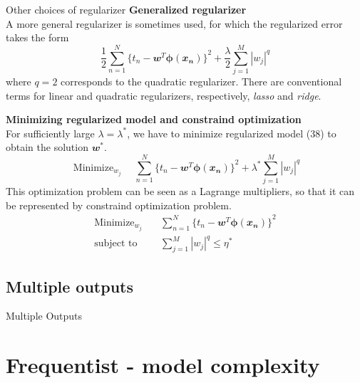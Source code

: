 \documentclass{bredelebeamer}
\DeclareMathOperator*{\minimize}{Minimize}
\begin{document}
\begin{frame}{Other choices of regularizer}
  \textbf{Generalized regularizer}\\
  A more general regularizer is sometimes used, for which the regularized error
  takes the form
  \begin{equation}
    \frac{1}{2} \sum_{n=1}^{N} {\{t_n - \mathbfit{w}^T \boldsymbol{\phi}(\mathbfit{x_n})\}}^2
    + \frac{\lambda}{2} \sum_{j=1}^{M} |w_j|^q
  \end{equation}
  where $q=2$ corresponds to the quadratic regularizer. There are conventional
  terms for linear and quadratic regularizers, respectively, \textit{lasso} and
  \textit{ridge}.

  \vspace{0.5\baselineskip}
  \textbf{Minimizing regularized model and constraind optimization}\\
  For sufficiently large $\lambda = \lambda^*$, we have to minimize regularized
  model (38) to obtain the solution $\mathbfit{w}^*$.
  \begin{equation}
    \minimize_{w_j} \quad
    \sum_{n=1}^{N} {\{t_n - \mathbfit{w}^T \boldsymbol{\phi}(\mathbfit{x_n})\}}^2
    + {\lambda^*} \sum_{j=1}^{M} |w_j|^q
  \end{equation}
  This optimization problem can be seen as a Lagrange multipliers, so that
  it can be represented by constraind optimization problem.
  \begin{equation}
    \begin{split}
      \minimize_{w_j} \quad
      & \sum_{n=1}^{N} {\{t_n - \mathbfit{w}^T \boldsymbol{\phi}(\mathbfit{x_n})\}}^2 \\
      \textrm{subject\ to} \quad
      & \sum_{j=1}^{M} |w_j|^q \leq \eta^*
    \end{split}
  \end{equation}
\end{frame}

\subsection{Multiple outputs}
\begin{frame}{Multiple Outputs}
\end{frame}

\section{Frequentist - model complexity}
\end{document}
